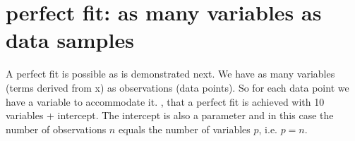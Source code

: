 \documentclass[letterpaper,10pt,english]{jupyterBook}
\begin{document}
\noindent{}


\section{perfect fit: as many variables as data samples}
\label{\detokenize{Regression_Techniques:perfect-fit-as-many-variables-as-data-samples}}
\sphinxAtStartPar
A perfect fit is possible as is demonstrated next. We have as many variables (terms derived from x) as observations (data points). So for each data point we have a variable to accommodate it.
, that a perfect fit is achieved with 10 variables + intercept. The intercept is also a parameter and in this case the number of observations \(n\) equals the number of variables \(p\), i.e. \(p=n\).
\end{document}
